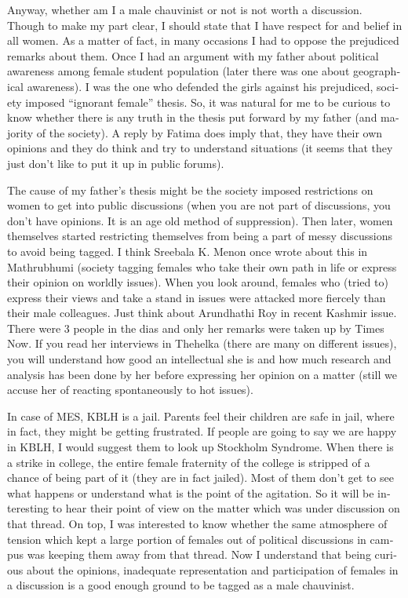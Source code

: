 \begin{english}
Anyway, whether am I a male chauvinist or not is not worth a discussion. Though to make my part clear, 
I should state that I have respect for and belief in all women. As a matter of fact, in many occasions I 
had to oppose the prejudiced remarks about them. Once I had an argument with my father about political 
awareness among female student population (later there was one about geographical awareness). I was 
the one who defended the girls against his prejudiced, society imposed “ignorant female” thesis. So, 
it was natural for me to be curious to know whether there is any truth in the thesis put forward by my father 
(and majority of the society). A reply by Fatima does imply that, they have their own opinions and they do 
think and try to understand situations (it seems that they just don't like to put it up in public forums).

The cause of my father's thesis might be the society imposed restrictions on women to get into public 
discussions (when you are not part of discussions, you don't have opinions. It is an age old method of 
suppression). Then later, women themselves started restricting themselves from being a part of messy 
discussions to avoid being tagged. I think Sreebala K. Menon once wrote about this in Mathrubhumi 
(society tagging females who take their own path in life or express their opinion on worldly issues). 
When you look around, females who (tried to) express their views and take a stand in issues were 
attacked more fiercely than their male colleagues. Just think about Arundhathi Roy in recent Kashmir 
issue. There were 3 people in the dias and only her remarks were taken up by Times Now. If you read 
her interviews in Thehelka (there are many on different issues), you will understand how good an intellectual 
she is and how much research and analysis has been done by her before expressing her opinion on a 
matter (still we accuse her of reacting spontaneously to hot issues).

In case of MES, KBLH is a jail. Parents feel their children are safe in jail, where in fact, they might be 
getting frustrated. If people are going to say we are happy in KBLH, I would suggest them to look up 
Stockholm Syndrome. When there is a strike in college, the entire female fraternity of the college is 
stripped of a chance of being part of it (they are in fact jailed). Most of them don't get to see 
what happens or understand what is the point of the agitation. So it will be interesting to hear 
their point of view on the matter which was under discussion on that thread. On top, I was interested 
to know whether the same atmosphere of tension which kept a large portion of females out of 
political discussions in campus was keeping them away from that thread. Now I understand that 
being curious about the opinions, inadequate representation and participation of females in a discussion 
is a good enough ground to be tagged as a male chauvinist.


\end{english}

